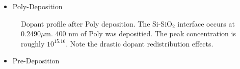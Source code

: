 \documentclass{article}
\begin{document}
\begin{description}[style = nextline]
\begin{itemize}
\item Poly-Deposition
\end{itemize}
\begin{figure}[H]
\centering
{}
\caption{Dopant profile after Poly deposition. The Si-Si$\text{O}_2$ interface occurs at 0.2490$\mu$m. 400 nm of Poly was depositied. The peak concentration is roughly ${10}^{15.16}$. Note the drastic dopant redistribution effects.}
\label{fig:doping3}
\end{figure}

\begin{itemize}
\item Pre-Deposition
\end{itemize}
\begin{figure}[H]
\centering
{}
\end{figure}
\end{description}
\end{document}
